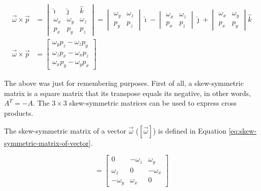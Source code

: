 \documentclass[12pt]{article}
\begin{document}
\begin{equation}\begin{aligned}
    \vec{\omega} \times \vec{p} &= 
        \begin{vmatrix} 
            \hat{\imath} & \hat{\jmath} & \hat{k} \\
            \omega_x & \omega_y & \omega_z \\
            p_x & p_y & p_z 
        \end{vmatrix} =
        \begin{vmatrix}
            \omega_y & \omega_z \\
            p_y & p_z
        \end{vmatrix} \hat{\imath} -
        \begin{vmatrix}
            \omega_x & \omega_z \\
            p_x & p_z 
        \end{vmatrix} \hat{\jmath} +
        \begin{vmatrix}
            \omega_x & \omega_y \\
            p_x & p_y
        \end{vmatrix} \hat{k} \\
    \vec{\omega} \times \vec{p} &= 
        \begin{bmatrix}
            \omega_y p_z - \omega_z p_y \\
            \omega_z p_x - \omega_x p_z \\
            \omega_x p_y - \omega_y p_x
        \end{bmatrix}
\end{aligned}
\label{eq:cross-product-determinant}
\end{equation}

The above was just for remembering purposes. First of all, a skew-symmetric matrix is a square matrix that its transpose equals its negative, in other words, $A^T = -A$. The $3 \times 3$ skew-symmetric matrices can be used to express cross products.

The skew-symmetric matrix of a vector $\vec{\omega}$ ($[\vec{\omega}]$) is defined in Equation \ref{eq:skew-symmetric-matrix-of-vector}.

\begin{equation}
    [\vec{\omega}] = \begin{bmatrix}
                        0 & -\omega_z & \omega_y \\
                        \omega_z & 0 & -\omega_x \\
                        -\omega_y & \omega_x & 0
                     \end{bmatrix}
    \label{eq:skew-symmetric-matrix-of-vector}
\end{equation}
\end{document}
